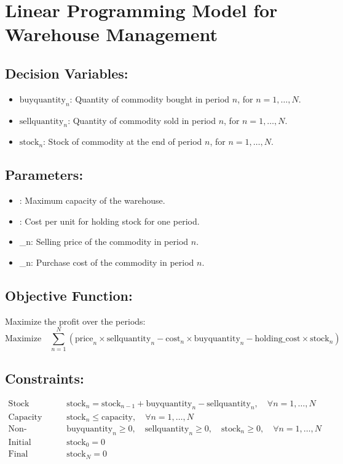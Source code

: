 \documentclass{article}
\begin{document}
\section*{Linear Programming Model for Warehouse Management}

\subsection*{Decision Variables:}
\begin{itemize}
    \item \( \text{buyquantity}_n \): Quantity of commodity bought in period \( n \), for \( n = 1, \ldots, N \).
    \item \( \text{sellquantity}_n \): Quantity of commodity sold in period \( n \), for \( n = 1, \ldots, N \).
    \item \( \text{stock}_n \): Stock of commodity at the end of period \( n \), for \( n = 1, \ldots, N \).
\end{itemize}

\subsection*{Parameters:}
\begin{itemize}
    \item {}: Maximum capacity of the warehouse.
    \item {}: Cost per unit for holding stock for one period.
    \item {}_n: Selling price of the commodity in period \( n \).
    \item {}_n: Purchase cost of the commodity in period \( n \).
\end{itemize}

\subsection*{Objective Function:}
Maximize the profit over the periods:
\[
\text{Maximize} \quad \sum_{n=1}^{N} (\text{price}_n \times \text{sellquantity}_n - \text{cost}_n \times \text{buyquantity}_n - \text{holding\_cost} \times \text{stock}_n)
\]

\subsection*{Constraints:}
\begin{align*}
\text{Stock Balance:} & \quad \text{stock}_n = \text{stock}_{n-1} + \text{buyquantity}_n - \text{sellquantity}_n, \quad \forall n = 1, \ldots, N \\
\text{Capacity Constraint:} & \quad \text{stock}_n \leq \text{capacity}, \quad \forall n = 1, \ldots, N \\
\text{Non-negativity:} & \quad \text{buyquantity}_n \geq 0, \quad \text{sellquantity}_n \geq 0, \quad \text{stock}_n \geq 0, \quad \forall n = 1, \ldots, N \\
\text{Initial Condition:} & \quad \text{stock}_0 = 0 \\
\text{Final Condition:} & \quad \text{stock}_N = 0
\end{align*}
\end{document}

